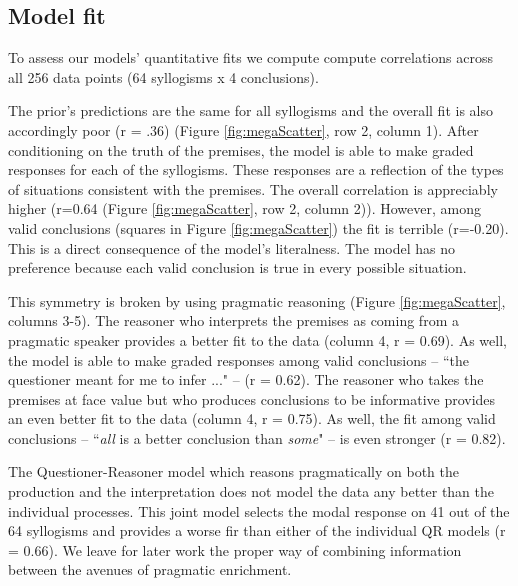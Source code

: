 \documentclass[10pt,letterpaper]{article}
\begin{document}
\subsection{Model fit}

To assess our models' quantitative fits we compute compute correlations across all 256 data points (64 syllogisms x 4 conclusions).

The prior's predictions are the same for all syllogisms and the overall fit is also accordingly poor (r = .36) (Figure \ref{fig:megaScatter}, row 2, column 1).  After conditioning on the truth of the premises, the model is able to make graded responses for each of the syllogisms. These responses are a reflection of the types of situations consistent with the premises. The overall correlation is appreciably higher (r=0.64 (Figure \ref{fig:megaScatter}, row 2, column 2)). However, among valid conclusions (squares in Figure \ref{fig:megaScatter}) the fit is terrible (r=-0.20). This is a direct consequence of the model's literalness. The model has no preference because each valid conclusion is true in every possible situation.

This symmetry is broken by using pragmatic reasoning (Figure \ref{fig:megaScatter}, columns 3-5). The reasoner who interprets the premises as coming from a pragmatic speaker provides a better fit to the data (column 4, r = 0.69). As well, the model is able to make graded responses among valid conclusions -- ``the questioner meant for me to infer ..." -- (r = 0.62). The reasoner who takes the premises at face value but who produces conclusions to be informative provides an even better fit to the data (column 4, r = 0.75). As well, the fit among valid conclusions -- ``\emph{all} is a better conclusion than \emph{some}" -- is even stronger (r = 0.82). 

The Questioner-Reasoner model which reasons pragmatically on both the production and the interpretation does not model the data any better than the individual processes. This joint model selects the modal response on 41 out of the 64 syllogisms and provides a worse fir than either of the individual QR models (r = 0.66). We leave for later work the proper way of combining information between the avenues of pragmatic enrichment.


\end{document}
